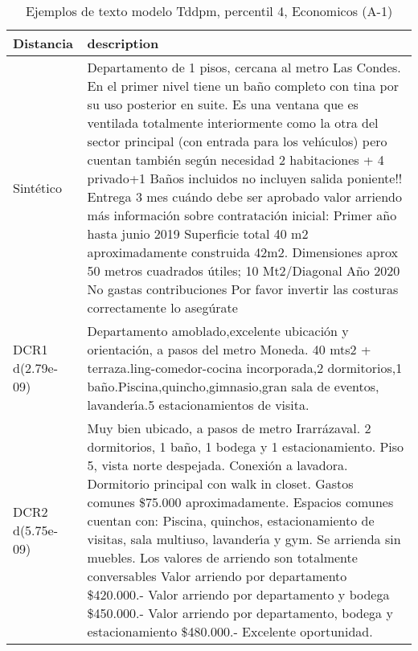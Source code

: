 \begin{table}[H]
\centering
\fontsize{10}{14}\selectfont
\caption{Ejemplos de texto modelo Tddpm, percentil 4, Economicos (A-1)}
\label{table-example-economicos-a-1-tddpm_mlp-4p-text}
\begin{tabular}{|l|m{35em}|}
\hline
\rowcolor[gray]{0.8}
Distancia & description \\
\hline Sintético & Departamento de 1 pisos, cercana al metro Las Condes. En el primer nivel tiene un ba\~no completo con tina por su uso posterior en suite. Es una ventana que es ventilada totalmente interiormente como la otra del sector principal (con entrada para los veh{\'\i}culos) pero cuentan tambi\'en seg\'un necesidad 2 habitaciones + 4 privado+1 Ba\~nos incluidos no incluyen salida poniente!! Entrega 3 mes cu\'ando debe ser aprobado valor arriendo m\'as informaci\'on sobre contrataci\'on inicial: Primer a\~no hasta junio 2019 Superficie total 40 m2 aproximadamente construida 42m2. Dimensiones aprox 50 metros cuadrados \'utiles; 10 Mt2/Diagonal A\~no 2020 No gastas contribuciones Por favor invertir las costuras correctamente lo aseg\'urate \\
\hline DCR1 d(2.79e-09) & Departamento amoblado,excelente ubicaci\'on y orientaci\'on, a pasos del metro Moneda. 40 mts2 + terraza.ling-comedor-cocina incorporada,2 dormitorios,1 ba\~no.Piscina,quincho,gimnasio,gran sala de eventos, lavander{\'\i}a.5 estacionamientos de visita. \\
\hline DCR2 d(5.75e-09) & Muy bien ubicado, a pasos de metro Irarr\'azaval.   2 dormitorios, 1 ba\~no, 1 bodega y 1 estacionamiento.  Piso 5, vista norte despejada.   Conexi\'on a lavadora.   Dormitorio principal con walk in closet.  Gastos comunes \$75.000 aproximadamente.   Espacios comunes cuentan con: Piscina, quinchos, estacionamiento de visitas, sala multiuso, lavander{\'\i}a y gym.  Se arrienda sin muebles.  Los valores de arriendo son totalmente conversables Valor arriendo por departamento \$420.000.- Valor arriendo por departamento y bodega \$450.000.- Valor arriendo por departamento, bodega y estacionamiento \$480.000.-  Excelente oportunidad. \\
\hline
\end{tabular}
\end{table}
